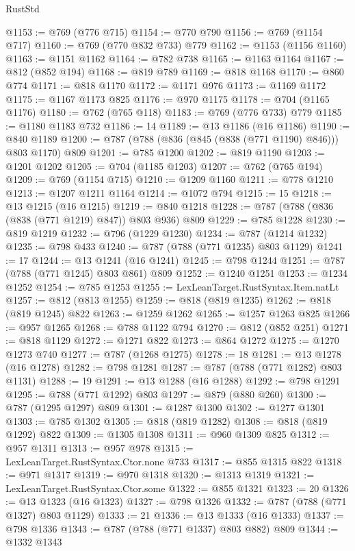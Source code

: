 \begin{lexlean}{RustStd}
\begin{coremodule}
@1153 := @769 (@776 @715)
@1154 := @770 @790
@1156 := @769 (@1154 @717)
@1160 := @769 (@770 @832 @733) @779
@1162 := @1153 (@1156 @1160)
@1163 := @1151 @1162
@1164 := @782 @738
@1165 := @1163 @1164
@1167 := @812 (@852 @194)
@1168 := @819 @789
@1169 := @818 @1168
@1170 := @860 @774
@1171 := @818 @1170
@1172 := @1171 @976
@1173 := @1169 @1172
@1175 := @1167 @1173 @825
@1176 := @970 @1175
@1178 := @704 (@1165 @1176)
@1180 := @762 (@765 @118)
@1183 := @769 (@776 @733) @779
@1185 := @1180 @1183 @732
@1186 := 14
@1189 := @13 @1186 (@16 @1186)
@1190 := @840 @1189
@1200 := @787 (@788 (@836 (@845 (@838 (@771 @1190) @846))) @803 @1170) @809
@1201 := @785 @1200
@1202 := @819 @1190
@1203 := @1201 @1202
@1205 := @704 (@1185 @1203)
@1207 := @762 (@765 @194)
@1209 := @769 (@1154 @715)
@1210 := @1209 @1160
@1211 := @778 @1210
@1213 := @1207 @1211 @1164
@1214 := @1072 @794
@1215 := 15
@1218 := @13 @1215 (@16 @1215)
@1219 := @840 @1218
@1228 := @787 (@788 (@836 (@838 (@771 @1219) @847)) @803 @936) @809
@1229 := @785 @1228
@1230 := @819 @1219
@1232 := @796 (@1229 @1230)
@1234 := @787 (@1214 @1232)
@1235 := @798 @433
@1240 := @787 (@788 (@771 @1235) @803 @1129)
@1241 := 17
@1244 := @13 @1241 (@16 @1241)
@1245 := @798 @1244
@1251 := @787 (@788 (@771 @1245) @803 @861) @809
@1252 := @1240 @1251
@1253 := @1234 @1252
@1254 := @785 @1253
@1255 := LexLeanTarget.RustSyntax.Item.natLt
@1257 := @812 (@813 @1255)
@1259 := @818 (@819 @1235)
@1262 := @818 (@819 @1245) @822
@1263 := @1259 @1262
@1265 := @1257 @1263 @825
@1266 := @957 @1265
@1268 := @788 @1122 @794
@1270 := @812 (@852 @251)
@1271 := @818 @1129
@1272 := @1271 @822
@1273 := @864 @1272
@1275 := @1270 @1273 @740
@1277 := @787 (@1268 @1275)
@1278 := 18
@1281 := @13 @1278 (@16 @1278)
@1282 := @798 @1281
@1287 := @787 (@788 (@771 @1282) @803 @1131)
@1288 := 19
@1291 := @13 @1288 (@16 @1288)
@1292 := @798 @1291
@1295 := @788 (@771 @1292) @803
@1297 := @879 (@880 @260)
@1300 := @787 (@1295 @1297) @809
@1301 := @1287 @1300
@1302 := @1277 @1301
@1303 := @785 @1302
@1305 := @818 (@819 @1282)
@1308 := @818 (@819 @1292) @822
@1309 := @1305 @1308
@1311 := @960 @1309 @825
@1312 := @957 @1311
@1313 := @957 @978
@1315 := LexLeanTarget.RustSyntax.Ctor.none @733
@1317 := @855 @1315 @822
@1318 := @971 @1317
@1319 := @970 @1318
@1320 := @1313 @1319
@1321 := LexLeanTarget.RustSyntax.Ctor.some
@1322 := @855 @1321
@1323 := 20
@1326 := @13 @1323 (@16 @1323)
@1327 := @798 @1326
@1332 := @787 (@788 (@771 @1327) @803 @1129)
@1333 := 21
@1336 := @13 @1333 (@16 @1333)
@1337 := @798 @1336
@1343 := @787 (@788 (@771 @1337) @803 @882) @809
@1344 := @1332 @1343

\end{coremodule}
\end{lexlean}
